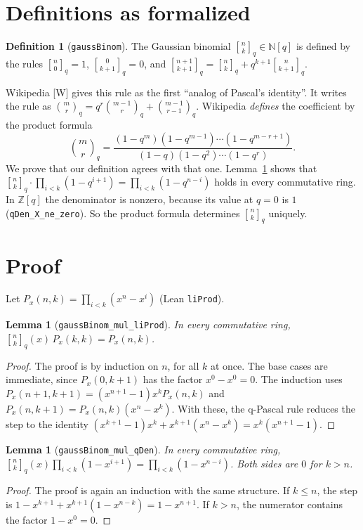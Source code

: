 \documentclass[11pt]{article}
\newtheorem{lemma}[theorem]{Lemma}
\theoremstyle{definition}
\newtheorem{definition}[theorem]{Definition}
\newcommand{\qb}[2]{\genfrac{[}{]}{0pt}{}{#1}{#2}_{q}}
\begin{document}
\section{Definitions as formalized}

\begin{definition}[\texttt{gaussBinom}]
The Gaussian binomial $\qb{n}{k}\in\mathbb{N}[q]$ is defined by the rules
$\qb{n}{0}=1$, $\qb{0}{k+1}=0$, and
$\qb{n+1}{k+1}=\qb{n}{k}+q^{k+1}\qb{n}{k+1}$.
\end{definition}

Wikipedia [W] gives this rule as the first ``analog of Pascal's identity''. It writes the rule
as $\binom{m}{r}_q=q^r\binom{m-1}{r}_q+\binom{m-1}{r-1}_q$. Wikipedia \emph{defines} the
coefficient by the product formula
\[\binom{m}{r}_q=\frac{(1-q^m)(1-q^{m-1})\cdots(1-q^{m-r+1})}{(1-q)(1-q^2)\cdots(1-q^r)}.\]
We prove that our definition agrees with that one. Lemma~\ref{lem:prod} shows that
$\qb{n}{k}\cdot\prod_{i<k}(1-q^{i+1})=\prod_{i<k}(1-q^{n-i})$ holds in every commutative ring.
In $\mathbb{Z}[q]$ the denominator is nonzero, because its value at $q=0$ is $1$
(\texttt{qDen\_X\_ne\_zero}). So the product formula determines $\qb{n}{k}$ uniquely.

\section{Proof}

Let $P_x(n,k)=\prod_{i<k}(x^n-x^i)$ (Lean \texttt{liProd}).

\begin{lemma}[\texttt{gaussBinom\_mul\_liProd}]\label{lem:li}
In every commutative ring, $\qb{n}{k}(x)\,P_x(k,k)=P_x(n,k)$.
\end{lemma}
\begin{proof}
The proof is by induction on $n$, for all $k$ at once. The base cases are immediate, since
$P_x(0,k+1)$ has the factor $x^0-x^0=0$. The induction uses
$P_x(n+1,k+1)=(x^{n+1}-1)x^kP_x(n,k)$ and $P_x(n,k+1)=P_x(n,k)(x^n-x^k)$. With these, the
q-Pascal rule reduces the step to the identity
$(x^{k+1}-1)x^k+x^{k+1}(x^n-x^k)=x^k(x^{n+1}-1)$.
\end{proof}

\begin{lemma}[\texttt{gaussBinom\_mul\_qDen}]\label{lem:prod}
In every commutative ring,
$\qb{n}{k}(x)\prod_{i<k}(1-x^{i+1})=\prod_{i<k}(1-x^{n-i})$. Both sides are $0$ for $k>n$.
\end{lemma}
\begin{proof}
The proof is again an induction with the same structure. If $k\le n$, the step is
$1-x^{k+1}+x^{k+1}(1-x^{n-k})=1-x^{n+1}$. If $k>n$, the numerator contains the factor $1-x^0=0$.
\end{proof}
\end{document}
